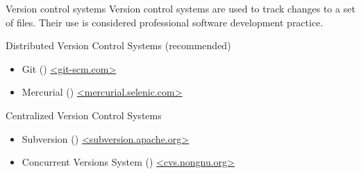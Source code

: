 \begin{block}{Version control systems}
  Version control systems are used to track changes to a set of files. Their use is considered professional software development practice.
  \begin{indented_itemize}
  \item Distributed Version Control Systems (recommended)
    \begin{itemize}
    \item Git () \url{<git-scm.com>}
    \item Mercurial () \url{<mercurial.selenic.com>}
    \end{itemize}
  \item Centralized Version Control Systems
    \begin{itemize}
    \item Subversion () \url{<subversion.apache.org>}
    \item Concurrent Versions System () \url{<cvs.nongnu.org>}
    \end{itemize}
  \end{indented_itemize}
  \vspace{1.5em}
\end{block}
